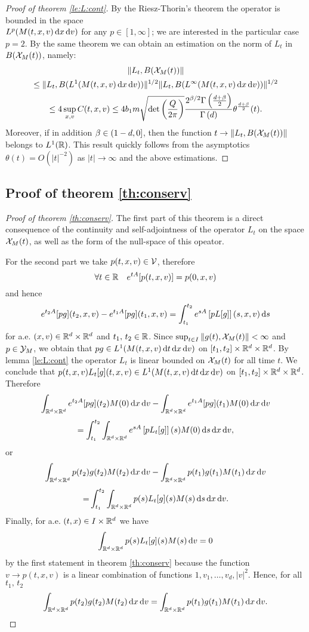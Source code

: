 \begin{subappendices}
\begin{proof}[Proof of theorem \ref{le:L:cont}]
	By the Riesz-Thorin's theorem the operator is bounded in the space\\ $L^p(M(t,x,v){\,\mathrm{d} x}{\,\mathrm{d} v})$ for any $p\in[1,\infty]$; we are interested in the particular case $p=2$. By the same theorem we can obtain an estimation on the norm of $L_t$ in $B({\mathcal X_M(t)})$, namely:
	\begin{multline*}
			\|L_t,B({\mathcal X_M(t)})\| \\
			\le\|L_t,B( L^1(M(t,x,v){\,\mathrm{d} x}{\,\mathrm{d} v}))\|^{1/2}\|L_t,B( L^\infty(M(t,x,v){\,\mathrm{d} x}{\,\mathrm{d} v}))\|^{1/2}
			\\\le 4  \sup_{x,v} C(t,x,v)
			\le 4b_1m \sqrt{\det\left(\frac{Q}{2 \pi }\right)} \frac{2^{\beta/2 }\Gamma\left(\frac{d+\beta}{2} \right)}{\Gamma\left( d \right)}\theta^{\frac{d +\beta}{2} }(t).
	\end{multline*}
	Moreover, if in addition $\beta \in ( 1-d ,0] $, then the function $t\to \|L_t,B({\mathcal X_M(t)})\|$ belongs to $L^1({\mathbb R})$. This result quickly follows from the asymptotics $\theta(t)=O(|t|^{-2})$ as $|t|\to \infty$ and the above estimations.
\end{proof}


\subsection{Proof of theorem
 \ref{th:conserv}} %
\label{sec:proof_of_theorems_conserv}
\begin{proof}[Proof of theorem \ref{th:conserv}]
The first part of this theorem is a direct consequence of the continuity and self-adjointness of the operator $L_t$  on the space ${\mathcal X_M(t)}$, as well as the form of the null-space of this opeator.

	For the second part we take $p(t,x,v)\in {\mathcal V}$, therefore 
	\[\forall t\in {\mathbb R} \quad e^{tA}[p(t,x,v)] = p(0,x,v)\]
	and hence
	\[e^{t_2A}[pg](t_2,x,v)-e^{t_1A}[pg](t_1,x,v)=\int_{t_1}^{t_2}e^{sA}\left[p L[g ]\right](s,x,v){\,\mathrm ds}\]
	for a.e. $(x,v)\in {{\mathbb R^d}\times{\mathbb R^d}}$ and $t_1,\,t_2\in{\mathbb R} $. Since $\sup_{t\in I}\|g(t),{\mathcal X_M(t)}\|<\infty$ and $p\in{\mathcal Y_M}$, we obtain that $pg\in L^1(M(t,x,v){\,\mathrm dt}{\,\mathrm{d} x}{\,\mathrm{d} v})$ on $[t_1,t_2]\times{{\mathbb R^d}\times{\mathbb R^d}}$. By lemma \ref{le:L:cont} the operator $L_t$ is linear bounded on ${\mathcal X_M(t)}$ for all time $t$. We conclude that $p(t,x,v)L_t[g](t,x,v)\in L^1(M(t,x,v){\,\mathrm dt}{\,\mathrm{d} x}{\,\mathrm{d} v})$ on $[t_1,t_2]\times{{\mathbb R^d}\times{\mathbb R^d}}$. Therefore
	\[
	\int_{{{\mathbb R^d}\times{\mathbb R^d}}} e^{t_2A}[pg](t_2)M(0){\,\mathrm{d} x}{\,\mathrm{d} v} - \int_{{{\mathbb R^d}\times{\mathbb R^d}}} e^{t_1A}[pg](t_1)M(0){\,\mathrm{d} x}{\,\mathrm{d} v} \]\[= 
	\int_{t_1}^{t_2}\int_{{{\mathbb R^d}\times{\mathbb R^d}}} e^{sA}\left[p L_t[g ]\right](s)M(0){\,\mathrm ds}{\,\mathrm{d} x}{\,\mathrm{d} v},
	\]
	or
	\[
	\int_{{{\mathbb R^d}\times{\mathbb R^d}}}   p(t_2)g (t_2)M(t_2){\,\mathrm{d} x}{\,\mathrm{d} v} - \int_{{{\mathbb R^d}\times{\mathbb R^d}}}   p(t_1)g (t_1)M(t_1){\,\mathrm{d} x}{\,\mathrm{d} v} \]\[{= }
	\int_{t_1}^{t_2}\int_{{{\mathbb R^d}\times{\mathbb R^d}}}  p(s) L_t[g ] (s)M(s){\,\mathrm ds}{\,\mathrm{d} x}{\,\mathrm{d} v}.
	\]
	Finally, for a.e. $(t,x)\in I\times{\mathbb R^d}$ we have \[
	\int_{{{\mathbb R^d}\times{\mathbb R^d}}}  p(s) L_t[g ] (s)M(s) {\,\mathrm{d} v}=0\]
	by the first statement in theorem \ref{th:conserv} because the function $v\to p(t,x,v)$ is a linear combination of  functions $1,v_1,\ldots,v_d,|v|^2$. Hence,
	for all $t_1,\,t_2$
	\[
	\int_{{{\mathbb R^d}\times{\mathbb R^d}}}   p(t_2)g (t_2)M(t_2){\,\mathrm{d} x}{\,\mathrm{d} v} = \int_{{{\mathbb R^d}\times{\mathbb R^d}}}   p(t_1)g (t_1)M(t_1){\,\mathrm{d} x}{\,\mathrm{d} v}. \]


\end{proof}
\end{subappendices}
